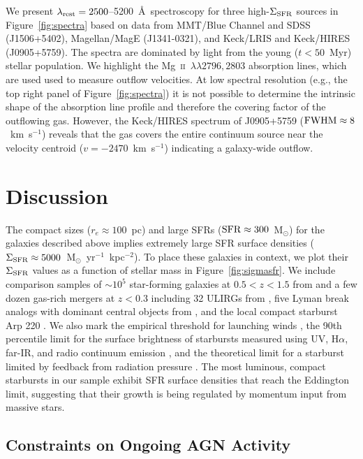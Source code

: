 \documentclass[apj]{emulateapj}
\newcommand{\kms}{km~s$^{-1}$}
\newcommand{\mgii}{\textrm{Mg}~\textsc{ii}}
\newcommand{\msun}{M$_{\odot}$}
\newcommand{\units}{M$_{\odot}$~yr$^{-1}$~kpc$^{-2}$}
\newcommand{\lrest}{\lambda_{\textnormal{\scriptsize{rest}}}}
\newcommand{\sigmasfr}{\Sigma_{\textnormal{\scriptsize{SFR}}}}
\begin{document}
We present $\lrest=2500$--5200~\AA\ spectroscopy for three
high-$\sigmasfr$ sources in Figure~\ref{fig:spectra} based on data
from MMT/Blue Channel and SDSS (J1506+5402), Magellan/MagE
(J1341-0321), and Keck/LRIS and Keck/HIRES (J0905+5759).  The spectra
are dominated by light from the young ($t<50$~Myr) stellar population.
We highlight the \mgii~$\lambda\lambda2796,2803$ absorption lines,
which are used used to measure outflow velocities.  At low spectral
resolution (e.g., the top right panel of Figure~\ref{fig:spectra}) it
is not possible to determine the intrinsic shape of the absorption
line profile and therefore the covering factor of the outflowing gas.
However, the Keck/HIRES spectrum of J0905+5759
($\textnormal{FWHM}\approx8$~\kms) reveals that the gas covers the
entire continuum source near the velocity centroid ($v=-2470$~\kms)
indicating a galaxy-wide outflow.


\section{Discussion}

The compact sizes ($r_e\approx100$~pc) and large SFRs
($\textnormal{SFR}\approx300$~\msun) for the galaxies described above
implies extremely large SFR surface densities
($\sigmasfr\approx5000$~\units).  To place these galaxies in context,
we plot their $\sigmasfr$ values as a function of stellar mass in
Figure~\ref{fig:sigmasfr}.  We include comparison samples of
$\sim10^5$ star-forming galaxies at $0.5<z<1.5$ from \citet{wuy11} and
a few dozen gas-rich mergers at $z<0.3$ including 32 ULIRGs from
\citet{vei06}, five Lyman break analogs with dominant central objects
from \citet{ove09}, and the local compact starburst Arp 220
\citep{sco97, ken98, rod08}.  We also mark the empirical threshold for
launching winds \citep[$\sigmasfr\approx0.1$~\units,][]{hec02}, the
90th percentile limit for the surface brightness of starbursts
measured using UV, H$\alpha$, far-IR, and radio continuum emission
\citep[$\sigmasfr\approx45$~\units][]{meu97}, and the theoretical
limit for a starburst limited by feedback from radiation pressure
\citep[$\sigmasfr\approx2000$~\units,][]{mur05,tho05,hop10}.  The most
luminous, compact starbursts in our sample exhibit SFR surface
densities that reach the Eddington limit, suggesting that their growth
is being regulated by momentum input from massive stars.


\subsection{Constraints on Ongoing AGN Activity}
\end{document}
